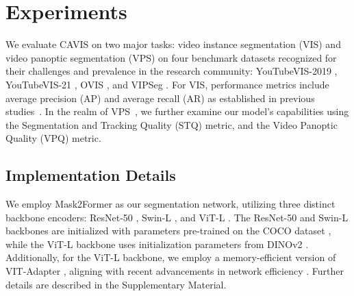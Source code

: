\documentclass[10pt,twocolumn,letterpaper]{article}
\begin{document}
\section{Experiments}
We evaluate CAVIS on two major tasks: video instance segmentation (VIS) and video panoptic segmentation (VPS) on four benchmark datasets recognized for their challenges and prevalence in the research community: YouTubeVIS-2019 \citep{yang2019video}, YouTubeVIS-21 \citep{vis2021}, OVIS \citep{qi2022occluded}, and VIPSeg \citep{miao2021vspw}.
For VIS, performance metrics include average precision (AP) and average recall (AR) as established in previous studies~\citep{yang2019video}. 
In the realm of VPS~\citep{Kim_2020_CVPR}, we further examine our model’s capabilities using the Segmentation and Tracking Quality (STQ) metric, and the Video Panoptic Quality (VPQ) metric.









\subsection{Implementation Details}
We employ Mask2Former \citep{cheng2022masked} as our segmentation network, utilizing three distinct backbone encoders: ResNet-50 \citep{he2016deep}, Swin-L \citep{liu2021swin}, and ViT-L \citep{dosovitskiy2021an}. The ResNet-50 and Swin-L backbones are initialized with parameters pre-trained on the COCO dataset \citep{lin2014microsoft}, while the ViT-L backbone uses initialization parameters from DINOv2 \citep{oquab2023dinov2}. Additionally, for the ViT-L backbone, we employ a memory-efficient version of VIT-Adapter \citep{chen2022vision}, aligning with recent advancements in network efficiency \citep{zhang2023dvis++}. 
Further details are described in the Supplementary Material.
\end{document}
